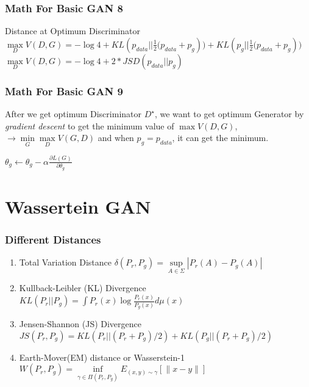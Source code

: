 \documentclass{beamer}[10]
\begin{document}
\begin{frame}
  \frametitle{Math For Basic GAN 8}
  \begin{block}{Distance at Optimum Discriminator}
    $ \max \limits_{D} V(D,G) =  -\log 4 + KL(p_{data} || {\frac{1}{2}(p_{data} + p_g} )) + KL(p_{g} || {\frac{1}{2}(p_{data} + p_g})) $ 
    $ \max \limits_{D} V(D,G) = -\log 4 + 2*JSD(p_{data}||p_g)$
  \end{block}
\end{frame}

\begin{frame}
  \frametitle{Math For Basic GAN 9}
  \begin{Theorem}
    After we get optimum Discriminator $D^\star$, we want to get optimum Generator by \emph{gradient descent} to get the minimum value of $\max V(D,G)$, $\to \min \limits_{G} \max \limits_{D}V(G,D) $ and when $p_g = p_{data}$, it can get the minimum.

    $\theta_{g} \leftarrow \theta_{g} - \alpha \frac{\partial L(G)}{\partial \theta_{g}}$
  \end{Theorem}
\end{frame}

\section{Wassertein GAN}
\begin{frame}
  \frametitle{Different Distances}
  \begin{enumerate}
    \item <1-> Total Variation Distance
      $ \delta(P_r,P_g) = \sup \limits_{A \in \Sigma} |P_r(A) - P_g(A)| $
    \item <2-> Kullback-Leibler (KL) Divergence 
      $ KL(P_r||P_g) = \int {P_r(x) \log \frac{P_r(x)}{P_g(x)}} d\mu(x) $ 
    \item <3-> Jensen-Shannon (JS) Divergence  \\
      $ JS(P_r,P_g) = KL(P_r||(P_r + P_g)/2) + KL(P_g || (P_r + P_g)/2) $
    \item <4-> Earth-Mover(EM) distance or Wasserstein-1
      $ W(P_r,P_g) = \inf \limits_{\gamma \in \Pi(P_r,P_g)} E_{(x,y) \sim \gamma} [ \|x-y\| ]$
  \end{enumerate}
\end{frame}
\end{document}
